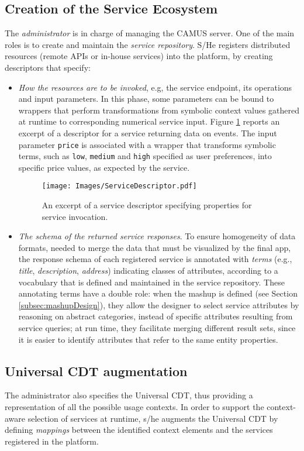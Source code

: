 \subsection{Creation of the Service Ecosystem}
The \emph{administrator} is in charge of managing the CAMUS server. One of the main roles is to create and maintain the \emph{service repository}. S/He registers distributed resources (remote APIs or in-house services) into the platform, by creating descriptors that specify:
\begin{itemize}
\item \emph{How the resources are to be invoked}, e.g, the service endpoint, its operations and input parameters. In this phase, some parameters can be bound to wrappers that perform transformations from symbolic context values gathered at runtime to corresponding numerical service input. Figure \ref{fig:serviceDescriptor} reports an excerpt of a descriptor for a service returning data on events.  The input parameter \texttt{price} is associated with a wrapper that transforms symbolic terms, such as \texttt{low}, \texttt{medium} and \texttt{high} specified as user preferences, into specific price values, as expected by the service.  

%
\begin{figure} [t]
\centering
\texttt{[image: Images/ServiceDescriptor.pdf]}
\caption{An excerpt of a service descriptor specifying properties for service invocation.}
\label{fig:serviceDescriptor}
\end{figure}
%

\item \emph{The schema of the returned service responses}. To ensure homogeneity of data formats, needed to merge the data that must be visualized by the final app, the response schema of each registered service is annotated with \emph{terms} (e.g., \emph{title}, \emph{description}, \emph{address}) indicating classes of attributes, according to a vocabulary that is defined and maintained in the service repository. These annotating terms have a double role: when the mashup is defined (see Section \ref{subsec:mashupDesign}), they allow the designer to select service attributes by reasoning on abstract categories, instead of specific attributes resulting from service queries; at run time, they facilitate merging different result sets, since it is easier to identify attributes that refer to the same entity properties. 
\end{itemize}    

\subsection{Universal CDT augmentation}
The administrator also specifies the Universal CDT, thus providing a representation of all the possible usage contexts. In order to support the context-aware selection of services at runtime, s/he augments the Universal CDT by defining \emph{mappings} between the identified context elements and the services registered in the platform. 

